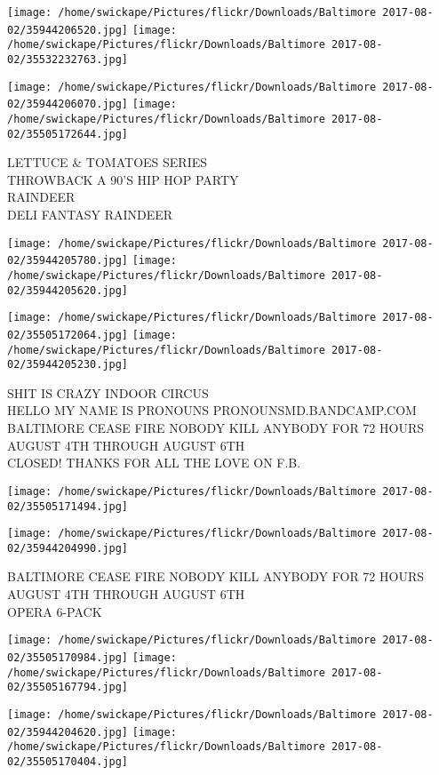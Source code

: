 \documentclass[10pt,letterpaper]{article}
\begin{document}
\texttt{[image: /home/swickape/Pictures/flickr/Downloads/Baltimore 2017-08-02/35944206520.jpg]}
\texttt{[image: /home/swickape/Pictures/flickr/Downloads/Baltimore 2017-08-02/35532232763.jpg]}

\texttt{[image: /home/swickape/Pictures/flickr/Downloads/Baltimore 2017-08-02/35944206070.jpg]}
\texttt{[image: /home/swickape/Pictures/flickr/Downloads/Baltimore 2017-08-02/35505172644.jpg]}

LETTUCE \& TOMATOES SERIES\\
THROWBACK A 90'S HIP HOP PARTY\\
RAINDEER\\
DELI FANTASY RAINDEER
\pagebreak

\texttt{[image: /home/swickape/Pictures/flickr/Downloads/Baltimore 2017-08-02/35944205780.jpg]}
\texttt{[image: /home/swickape/Pictures/flickr/Downloads/Baltimore 2017-08-02/35944205620.jpg]}

\texttt{[image: /home/swickape/Pictures/flickr/Downloads/Baltimore 2017-08-02/35505172064.jpg]}
\texttt{[image: /home/swickape/Pictures/flickr/Downloads/Baltimore 2017-08-02/35944205230.jpg]}

SHIT IS CRAZY INDOOR CIRCUS\\
HELLO MY NAME IS PRONOUNS PRONOUNSMD.BANDCAMP.COM\\
BALTIMORE CEASE FIRE NOBODY KILL ANYBODY FOR 72 HOURS AUGUST 4TH THROUGH AUGUST 6TH\\
CLOSED! THANKS FOR ALL THE LOVE ON F.B.
\pagebreak

\texttt{[image: /home/swickape/Pictures/flickr/Downloads/Baltimore 2017-08-02/35505171494.jpg]}

\vspace{0.25in}
\texttt{[image: /home/swickape/Pictures/flickr/Downloads/Baltimore 2017-08-02/35944204990.jpg]}

BALTIMORE CEASE FIRE NOBODY KILL ANYBODY FOR 72 HOURS AUGUST 4TH THROUGH AUGUST 6TH\\
OPERA 6{-}PACK
\pagebreak

\texttt{[image: /home/swickape/Pictures/flickr/Downloads/Baltimore 2017-08-02/35505170984.jpg]}
\texttt{[image: /home/swickape/Pictures/flickr/Downloads/Baltimore 2017-08-02/35505167794.jpg]}

\texttt{[image: /home/swickape/Pictures/flickr/Downloads/Baltimore 2017-08-02/35944204620.jpg]}
\texttt{[image: /home/swickape/Pictures/flickr/Downloads/Baltimore 2017-08-02/35505170404.jpg]}
\end{document}
